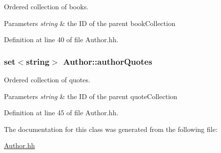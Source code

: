Ordered collection of books. 


\begin{DoxyParams}{Parameters}
{\em string} & the ID of the parent book\+Collection \\
\hline
\end{DoxyParams}


Definition at line 40 of file Author.\+hh.

\subsubsection[{\texorpdfstring{author\+Quotes}{authorQuotes}}]{\setlength{\rightskip}{0pt plus 5cm}set$<$string$>$ Author\+::author\+Quotes\hspace{0.3cm}{\ttfamily [private]}}\hypertarget{class_author_ad505d991f439d28c4831828952e01fb6}{}\label{class_author_ad505d991f439d28c4831828952e01fb6}


Ordered collection of quotes. 


\begin{DoxyParams}{Parameters}
{\em string} & the ID of the parent quote\+Collection \\
\hline
\end{DoxyParams}


Definition at line 45 of file Author.\+hh.



The documentation for this class was generated from the following file\+:\begin{DoxyCompactItemize}
\item 
\hyperlink{_author_8hh}{Author.\+hh}\end{DoxyCompactItemize}
